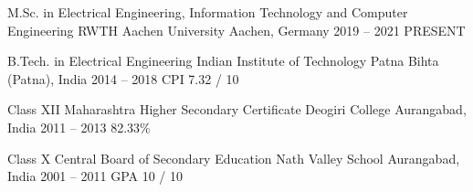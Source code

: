 
\begin{cveducation}

\cvschool
	{M.Sc. in Electrical Engineering, Information Technology and Computer Engineering} %
	{RWTH Aachen University} %
	{Aachen, Germany} %
	{2019 -- 2021} %
	{PRESENT} %

\cvschool
	{B.Tech. in Electrical Engineering} %
	{Indian Institute of Technology Patna} %
	{Bihta (Patna), India} %
	{2014 -- 2018} %
	{CPI 7.32 / 10} %

\cvschool
	{Class XII Maharashtra Higher Secondary Certificate} %
	{Deogiri College} %
	{Aurangabad, India} %
	{2011 -- 2013} %
	{82.33\%} %

\cvschool
	{Class X Central Board of Secondary Education} %
	{Nath Valley School} %
	{Aurangabad, India} %
	{2001 -- 2011} %
	{GPA 10 / 10} %

\end{cveducation}
